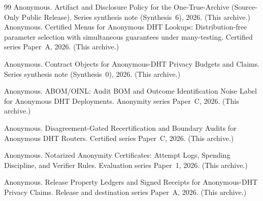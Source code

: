 \documentclass[11pt]{article}
\begin{document}
\begin{thebibliography}{99}\small
{}
Anonymous.
\newblock Artifact and Disclosure Policy for the One-True-Archive (Source-Only Public Release).
\newblock Series synthesis note (Synthesis~6), 2026. (This archive.)
Anonymous.
\newblock Certified Menus for Anonymous DHT Lookups: Distribution-free parameter selection with simultaneous guarantees under many-testing.
\newblock Certified series Paper~A, 2026. (This archive.)

Anonymous.
\newblock Contract Objects for Anonymous-DHT Privacy Budgets and Claims.
\newblock Series synthesis note (Synthesis~0), 2026. (This archive.)

Anonymous.
\newblock ABOM/OINL: Audit BOM and Outcome Identification Noise Label for Anonymous DHT Deployments.
\newblock Anonymity series Paper~C, 2026. (This archive.)

Anonymous.
\newblock Disagreement-Gated Recertification and Boundary Audits for Anonymous DHT Routers.
\newblock Certified series Paper~C, 2026. (This archive.)

Anonymous.
\newblock Notarized Anonymity Certificates: Attempt Logs, Spending Discipline, and Verifier Rules.
\newblock Evaluation series Paper~1, 2026. (This archive.)

Anonymous.
\newblock Release Property Ledgers and Signed Receipts for Anonymous-DHT Privacy Claims.
\newblock Release and destination series Paper~A, 2026. (This archive.)

\end{thebibliography}
\end{document}
